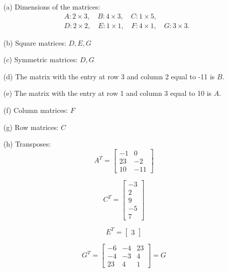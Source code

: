 \documentclass{article}
\begin{document}
\begin{enumerate}
    \item[(a)] Dimensions of the matrices:
    \[
    \begin{aligned}
    &A: 2 \times 3, \quad B: 4 \times 3, \quad C: 1 \times 5, \\
    &D: 2 \times 2, \quad E: 1 \times 1, \quad F: 4 \times 1, \quad G: 3 \times 3.
    \end{aligned}
    \]

    \item[(b)] Square matrices: \(D, E, G\) 

    \item[(c)] Symmetric matrices: \(D, G\)

    \item[(d)] The matrix with the entry at row 3 and column 2 equal to -11 is \( B \).

    \item[(e)] The matrix with the entry at row 1 and column 3 equal to 10 is \( A \).

    \item[(f)] Column matrices: \( F \) 

    \item[(g)] Row matrices: \( C \) 

    \item[(h)] Transposes:
    \[
    A^T =
    \begin{bmatrix}
    -1 & 0 \\
    23 & -2 \\
    10 & -11
    \end{bmatrix}
    \]
    
    \[
    C^T =
    \begin{bmatrix}
    -3 \\
    2 \\
    9 \\
    -5 \\
    7
    \end{bmatrix}
    \]

    \[
    E^T =
    \begin{bmatrix}
    3
    \end{bmatrix}
    \]

    \[
    G^T =
    \begin{bmatrix}
    -6 & -4 & 23 \\
    -4 & -3 & 4 \\
    23 & 4 & 1
    \end{bmatrix} = G
    \]
\end{enumerate}
\end{document}
